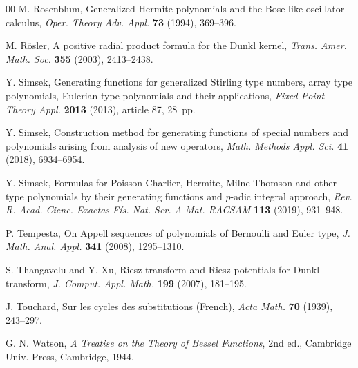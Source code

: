 \documentclass[11pt,a4paper]{article}
\theoremstyle{plain}
\theoremstyle{remark}
\begin{document}
\begin{thebibliography}{00}
M. Rosenblum,
{Generalized Hermite polynomials and the Bose-like oscillator calculus},
\textit{Oper. Theory Adv. Appl.}
\textbf{73} (1994), 369--396.

M. R\"osler,
A positive radial product formula for the Dunkl kernel,
\textit{Trans. Amer. Math. Soc.}
\textbf{355} (2003), 2413--2438.

Y. Simsek,
Generating functions for generalized Stirling type numbers, array type polynomials, Eulerian type polynomials and their applications,
\textit{Fixed Point Theory Appl.}
\textbf{2013} (2013), article 87, 28~pp.

Y. Simsek,
Construction method for generating functions of special numbers and polynomials arising from analysis of new operators,
\textit{Math. Methods Appl. Sci.}
\textbf{41} (2018), 6934--6954. %

Y. Simsek,
Formulas for Poisson-Charlier, Hermite, Milne-Thomson and other type polynomials by their generating functions and $p$-adic integral approach,
\textit{Rev. R. Acad. Cienc. Exactas F\'is. Nat. Ser. A Mat. RACSAM}
\textbf{113} (2019), 931--948. %

P. Tempesta,
On Appell sequences of polynomials of Bernoulli and Euler type,
\textit{J. Math. Anal. Appl.} 
\textbf{341} (2008), 1295--1310.

S. Thangavelu and Y. Xu,
Riesz transform and Riesz potentials for Dunkl transform,
\textit{J. Comput. Appl. Math.}
\textbf{199} (2007), 181--195.

J. Touchard,
Sur les cycles des substitutions (French),
\textit{Acta Math.} \textbf{70} (1939), 243--297. %

G. N. Watson,
\textit{A Treatise on the Theory of Bessel Functions}, 2nd ed.,
Cambridge Univ. Press,
Cambridge, 1944.

\end{thebibliography}

\end{document}

